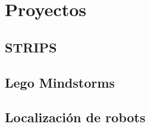 \documentclass[12pt,openany]{book}
\begin{document}







\part{Proyectos}



\chapter{STRIPS}




\chapter{Lego Mindstorms}





\chapter{Localización de robots}







%


%



\backmatter

\printbibliography[heading=bibintoc]
\end{document}
